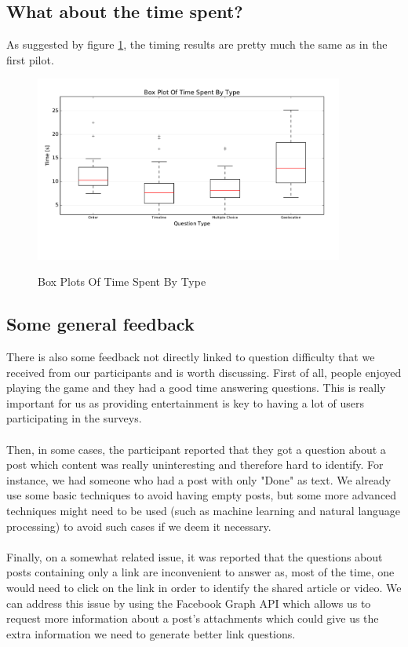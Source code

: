 \subsection{What about the time spent?}
As suggested by figure \ref{fig:p2BoxesTime}, the timing results are pretty much the same as in the first pilot.
\begin{figure}
\centering
{\includegraphics[width=4in]{images/pilot_2_boxplot_time.pdf}}
\caption{Box Plots Of Time Spent By Type}
\label{fig:p2BoxesTime}
\end{figure}

\subsection{Some general feedback}
There is also some feedback not directly linked to question difficulty that we received from our participants and is worth discussing. First of all, people enjoyed playing the game and they had a good time answering questions. This is really important for us as providing entertainment is key to having a lot of users participating in the surveys.\\\\
Then, in some cases, the participant reported that they got a question about a post which content was really uninteresting and therefore hard to identify. For instance, we had someone who had a post with only "Done" as text. We already use some basic techniques to avoid having empty posts, but some more advanced techniques might need to be used (such as machine learning and natural language processing\cite{nlp}) to avoid such cases if we deem it necessary.\\\\
Finally, on a somewhat related issue, it was reported that the questions about posts containing only a link are inconvenient to answer as, most of the time, one would need to click on the link in order to identify the shared article or video. We can address this issue by using the Facebook Graph API which allows us to request more information about a post's attachments which could give us the extra information we need to generate better link questions.
